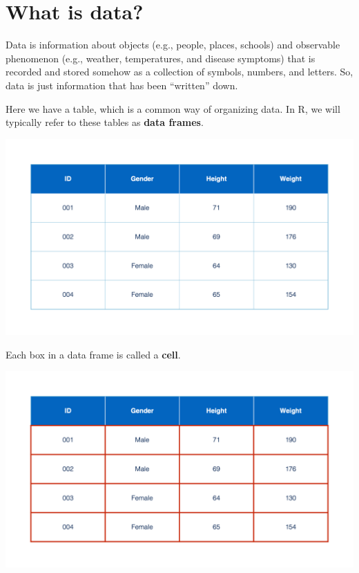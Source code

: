 \documentclass[
  letterpaper,
  DIV=11,
  numbers=noendperiod]{scrreprt}
\begin{document}
\section{What is data?}\label{what-is-data}

Data is information about objects (e.g., people, places, schools) and
observable phenomenon (e.g., weather, temperatures, and disease
symptoms) that is recorded and stored somehow as a collection of
symbols, numbers, and letters. So, data is just information that has
been ``written'' down.

Here we have a table, which is a common way of organizing data. In R, we
will typically refer to these tables as \textbf{data frames}.

\includegraphics{chapters/what_is_r/table.png}

Each box in a data frame is called a \textbf{cell}.

\includegraphics{chapters/what_is_r/table_cells.png}
\end{document}
